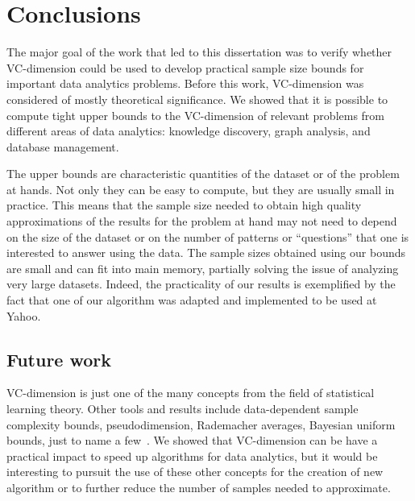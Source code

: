 \chapter{Conclusions}\label{ch:conclusions}

The major goal of the work that led to this dissertation was to verify whether
VC-dimension could be used to develop practical sample size bounds for important
data analytics problems. Before this work, VC-dimension was considered of mostly
theoretical significance. We showed that it is possible to compute tight upper
bounds to the VC-dimension of relevant problems from different areas of data
analytics: knowledge discovery, graph analysis, and database management. 

The upper bounds are characteristic quantities of the dataset or of the
problem at hands. Not only they can be easy to compute, but they are usually
small in practice. This means that the sample size needed to obtain high quality
approximations of the results for the problem at hand may not need to depend on
the size of the dataset or on the number of patterns or ``questions'' that one
is interested to answer using the data. The sample sizes obtained using our
bounds are small and can fit into main memory, partially solving the issue of
analyzing very large datasets. Indeed, the practicality of our results is
exemplified by the fact that one of our algorithm was adapted and implemented to
be used at Yahoo.


\section*{Future work} VC-dimension is just one of the many concepts from the
field of statistical learning theory. Other tools and results
include data-dependent sample complexity bounds, pseudodimension, Rademacher
averages, Bayesian uniform bounds, just to name a
few~\citep{BoucheronBL05,AnthonyB99,DevroyeGL96}. We showed that VC-dimension
can be have a practical impact to speed up algorithms for data analytics, but it
would be interesting to pursuit the use of these other concepts for the creation
of new algorithm or to further reduce the number of samples needed to
approximate. 

